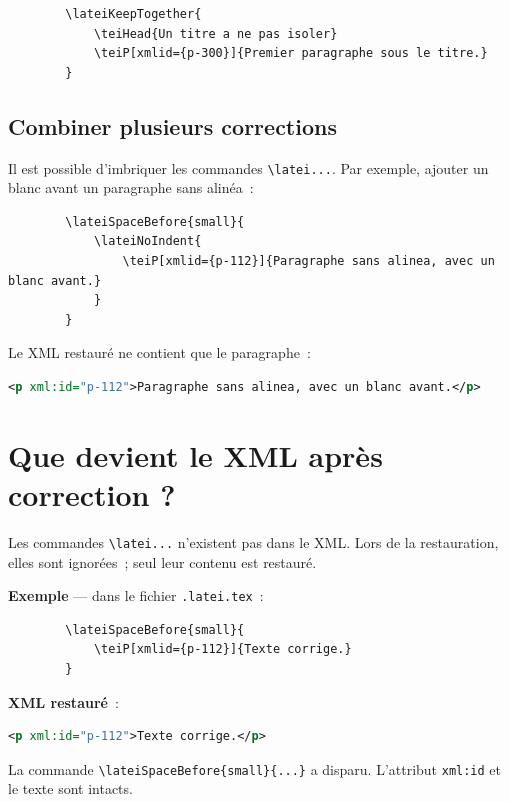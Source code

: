 \documentclass[11pt,a4paper]{article}
\newcommand{\cmd}[1]{\texttt{\textbackslash #1}}
\begin{document}
	\begin{lstlisting}
		\lateiKeepTogether{
			\teiHead{Un titre a ne pas isoler}
			\teiP[xmlid={p-300}]{Premier paragraphe sous le titre.}
		}
	\end{lstlisting}
	
	\subsection{Combiner plusieurs corrections}
	
	Il est possible d'imbriquer les commandes \cmd{latei...}. Par exemple,
	ajouter un blanc avant un paragraphe sans alinéa~:
	
	\begin{lstlisting}
		\lateiSpaceBefore{small}{
			\lateiNoIndent{
				\teiP[xmlid={p-112}]{Paragraphe sans alinea, avec un blanc avant.}
			}
		}
	\end{lstlisting}
	
	Le XML restauré ne contient que le paragraphe~:
	
	\begin{lstlisting}[language=XML]
		<p xml:id="p-112">Paragraphe sans alinea, avec un blanc avant.</p>
	\end{lstlisting}
	
	\section{Que devient le XML après correction ?}
	
	Les commandes \cmd{latei...} n'existent pas dans le XML. Lors de la
	restauration, elles sont ignorées~; seul leur contenu est restauré.
	
	\textbf{Exemple} — dans le fichier \texttt{.latei.tex}~:
	
	\begin{lstlisting}
		\lateiSpaceBefore{small}{
			\teiP[xmlid={p-112}]{Texte corrige.}
		}
	\end{lstlisting}
	
	\textbf{XML restauré}~:
	
	\begin{lstlisting}[language=XML]
		<p xml:id="p-112">Texte corrige.</p>
	\end{lstlisting}
	
	La commande \texttt{\textbackslash lateiSpaceBefore\{small\}\{...\}} a
	disparu. L'attribut \texttt{xml:id} et le texte sont intacts.
	
\end{document}
